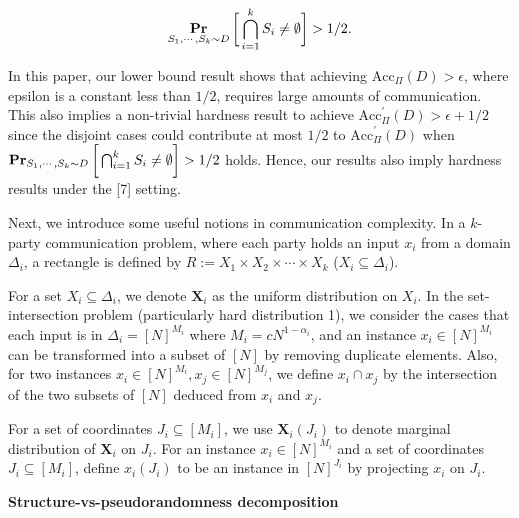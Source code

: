 \documentclass[10pt,a4paper]{article}
\begin{document}
\[\begin{gathered}
\operatorname*{\mathbf{Pr}}_{S_{1},\cdots,S_{k}\sim D}\bigg{[}\bigcap_{i=1}^{k}S_{i}\neq\emptyset\bigg{]}>1/2.
\end{gathered}\]


In this paper, our lower bound result shows that achieving $\text{Acc}_{\Pi}(D)>\epsilon$, where epsilon is a constant less than $1/2$, requires large amounts of communication. This also implies a non-trivial hardness result to achieve $\text{Acc}^{\prime}_{\Pi}(D)>\epsilon+1/2$ since the disjoint cases could contribute at most $1/2$ to $\text{Acc}^{\prime}_{\Pi}(D)$ when $\operatorname*{\mathbf{Pr}}_{S_{1},\cdots,S_{k}\sim D}\bigg{[}\bigcap_{i=1}^{k}S_{i}\neq\emptyset\bigg{]}>1/2$ holds. Hence, our results also imply hardness results under the [7] setting.\par




Next, we introduce some useful notions in communication complexity. In a $k$-party communication problem, where each party holds an input $x_{i}$ from a domain $\Delta_{i}$, a rectangle is defined by $R:=X_{1}\times X_{2}\times\cdots\times X_{k}$ ($X_{i}\subseteq\Delta_{i}$).\par




For a set $X_{i}\subseteq\Delta_{i}$, we denote $\bm{X}_{i}$ as the uniform distribution on $X_{i}$. In the set-intersection problem (particularly hard distribution 1), we consider the cases that each input is in $\Delta_{i}=[N]^{M_{i}}$ where $M_{i}=cN^{1-\alpha_{i}}$, and an instance $x_{i}\in[N]^{M_{i}}$ can be transformed into a subset of $[N]$ by removing duplicate elements. Also, for two instances $x_{i}\in[N]^{M_{i}},x_{j}\in[N]^{M_{j}}$, we define $x_{i}\cap x_{j}$ by the intersection of the two subsets of $[N]$ deduced from $x_{i}$ and $x_{j}$.\par




For a set of coordinates $J_{i}\subseteq[M_{i}]$, we use $\bm{X}_{i}(J_{i})$ to denote marginal distribution of $\bm{X}_{i}$ on $J_{i}$. For an instance $x_{i}\in[N]^{M_{i}}$ and a set of coordinates $J_{i}\subseteq[M_{i}]$, define $x_{i}({J_{i}})$ to be an instance in $[N]^{J_{i}}$ by projecting $x_{i}$ on $J_{i}$.\par





\par\medskip\noindent\textbf{Structure-vs-pseudorandomness decomposition}\par
\end{document}
